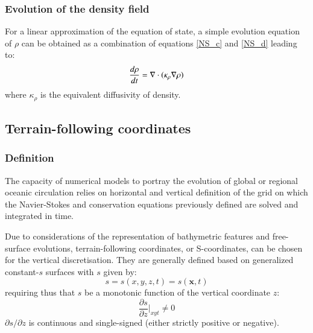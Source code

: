 \subsubsection{Evolution of the density field}
For a linear approximation of the equation of state, a simple evolution equation of $\rho$ can be obtained as a combination of equations \ref{NS_c} and \ref{NS_d} leading to:
\begin{equation}
\displaystyle
\frac{d \rho}{d t}=
 \mathbf{\nabla}\cdot\color{black}(\kappa_{\rho} \mathbf{\nabla}{\rho})
\label{eq_diff_cart}
\end{equation}
where $\kappa_{\rho}$ is the equivalent diffusivity of density.

 
\subsection{Terrain-following coordinates}
\label{subsection_scoord}

\subsubsection{Definition}
The capacity of numerical models to portray the evolution of global or regional oceanic circulation relies on horizontal and vertical definition of the grid on which the Navier-Stokes and conservation equations previously defined are solved and integrated in time.

Due to considerations of the representation of bathymetric features and free-surface evolutions, terrain-following coordinates, or S-coordinates, can be chosen for the vertical discretisation. They are generally defined based on generalized constant-$s$ surfaces with $s$ given by:
\begin{equation}
 \displaystyle
 s=s(x,y,z,t)=s(\mathbf{x},t)
\end{equation}
requiring thus that $s$ be a monotonic function of the vertical coordinate $z$:
\begin{equation}
 \displaystyle
 \frac{\partial s}{\partial z}\bigg\vert_{xyt}\ne 0
\end{equation}
$\partial s / \partial z$ is continuous and single-signed (either strictly positive or negative).

